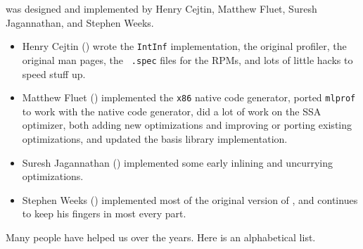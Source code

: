 
{\mlton} was designed and implemented by Henry Cejtin, Matthew Fluet, Suresh
Jagannathan, and Stephen Weeks.

\begin{itemize}

\item
Henry Cejtin () wrote the {\tt IntInf}
implementation, the original profiler, the original man pages, the {\tt
.spec} files for the RPMs, and lots of little hacks to speed stuff up.

\item
Matthew Fluet () implemented the {\tt x86} native
code generator, ported {\tt mlprof} to work with the native code generator, 
did a lot of work on the SSA optimizer, both adding new optimizations and
improving or porting existing optimizations, and updated the basis library 
implementation.

\item
Suresh Jagannathan () implemented
some early inlining and uncurrying optimizations.

\item
Stephen Weeks () implemented most of the original
version of {\mlton}, and continues to keep his fingers in most every part.

\end{itemize}
Many people have helped us over the years.  Here is an alphabetical list.

